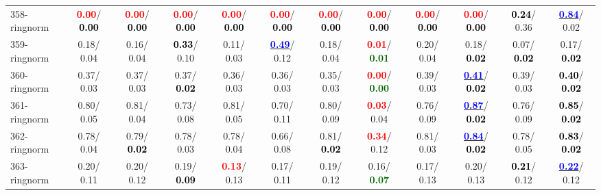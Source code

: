 \begin{table}[h]
\begin{center}
{\begin{tabular}{lc|c|c|c|c|c|c|c|c|c|c}
358-ringnorm & \textcolor{red}{\textbf{  0.00}}/\textcolor{black}{\textbf{  0.00}} & \textcolor{red}{\textbf{  0.00}}/\textcolor{black}{\textbf{  0.00}} & \textcolor{red}{\textbf{  0.00}}/\textcolor{black}{\textbf{  0.00}} & \textcolor{red}{\textbf{  0.00}}/\textcolor{black}{\textbf{  0.00}} & \textcolor{red}{\textbf{  0.00}}/\textcolor{black}{\textbf{  0.00}} & \textcolor{red}{\textbf{  0.00}}/\textcolor{black}{\textbf{  0.00}} & \textcolor{red}{\textbf{  0.00}}/\textcolor{black}{\textbf{  0.00}} & \textcolor{red}{\textbf{  0.00}}/\textcolor{black}{\textbf{  0.00}} & \textcolor{red}{\textbf{  0.00}}/\textcolor{black}{\textbf{  0.00}} & \textcolor{black}{\textbf{  0.24}}/  0.36 & \underline{\textcolor{blue}{\textbf{  0.84}}}/  0.02 \\
359-ringnorm &   0.18/  0.04 &   0.16/  0.04 & \textcolor{black}{\textbf{  0.33}}/  0.10 &   0.11/  0.03 & \underline{\textcolor{blue}{\textbf{  0.49}}}/  0.12 &   0.18/  0.04 & \textcolor{red}{\textbf{  0.01}}/\textcolor{darkgreen}{\textbf{  0.01}} &   0.20/  0.04 &   0.18/\textcolor{black}{\textbf{  0.02}} &   0.07/\textcolor{black}{\textbf{  0.02}} &   0.17/\textcolor{black}{\textbf{  0.02}} \\ \hline
360-ringnorm &   0.37/  0.03 &   0.37/  0.03 &   0.37/\textcolor{black}{\textbf{  0.02}} &   0.36/  0.03 &   0.36/  0.03 &   0.35/  0.03 & \textcolor{red}{\textbf{  0.00}}/\textcolor{darkgreen}{\textbf{  0.00}} &   0.39/  0.03 & \underline{\textcolor{blue}{\textbf{  0.41}}}/\textcolor{black}{\textbf{  0.02}} &   0.39/  0.03 & \textcolor{black}{\textbf{  0.40}}/\textcolor{black}{\textbf{  0.02}} \\
361-ringnorm &   0.80/  0.05 &   0.81/  0.04 &   0.73/  0.08 &   0.81/  0.05 &   0.70/  0.11 &   0.80/  0.09 & \textcolor{red}{\textbf{  0.03}}/  0.04 &   0.76/  0.09 & \underline{\textcolor{blue}{\textbf{  0.87}}}/\textcolor{black}{\textbf{  0.02}} &   0.76/  0.09 & \textcolor{black}{\textbf{  0.85}}/\textcolor{black}{\textbf{  0.02}} \\
362-ringnorm &   0.78/  0.04 &   0.79/\textcolor{black}{\textbf{  0.02}} &   0.78/  0.03 &   0.78/  0.04 &   0.66/  0.08 &   0.81/\textcolor{black}{\textbf{  0.02}} & \textcolor{red}{\textbf{  0.34}}/  0.12 &   0.81/  0.03 & \underline{\textcolor{blue}{\textbf{  0.84}}}/\textcolor{black}{\textbf{  0.02}} &   0.78/  0.05 & \textcolor{black}{\textbf{  0.83}}/\textcolor{black}{\textbf{  0.02}} \\
363-ringnorm &   0.20/  0.11 &   0.20/  0.12 &   0.19/\textcolor{black}{\textbf{  0.09}} & \textcolor{red}{\textbf{  0.13}}/  0.13 &   0.17/  0.11 &   0.19/  0.12 &   0.16/\textcolor{darkgreen}{\textbf{  0.07}} &   0.17/  0.13 &   0.20/  0.13 & \textcolor{black}{\textbf{  0.21}}/  0.12 & \underline{\textcolor{blue}{\textbf{  0.22}}}/  0.12 \\

\end{tabular}}
\end{center}
\end{table}
